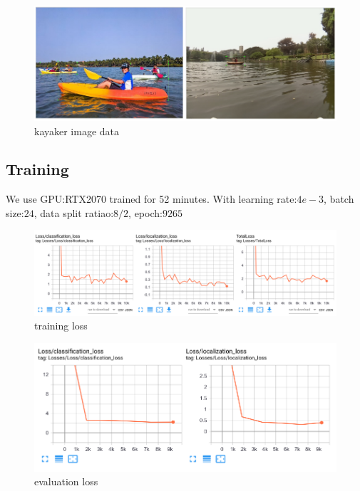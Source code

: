 \begin{figure}[ht]
    \includegraphics[width=1\columnwidth]{images/kayaker.png}
    \centering
    \caption{kayaker image data}
    \label{figure:kayaker}
\end{figure}

\subsection{Training}

We use GPU:RTX2070 trained for 52 minutes. With learning rate:$4e-3$, batch size:$24$, data split ratiao:$8/2$, epoch:$9265$

\begin{figure}[ht]
    \includegraphics[width=1\columnwidth]{images/train_loss.png}
    \centering
    \caption{training loss}
    \label{figure:training_loss}
\end{figure}

\begin{figure}[ht]
    \includegraphics[width=1\columnwidth]{images/eval_loss.png}
    \centering
    \caption{evaluation loss}
    \label{figure:eval_loss}
\end{figure}

